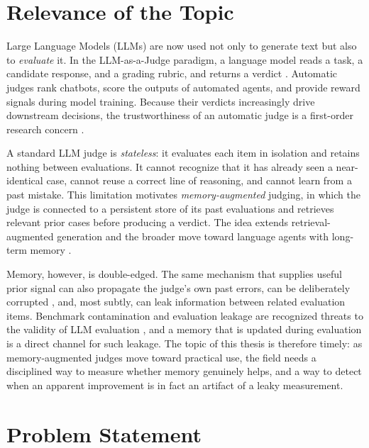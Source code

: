 \documentclass[14pt,a4paper]{extreport}
\begin{document}
\section{Relevance of the Topic}

Large Language Models (LLMs) are now used not only to generate text but also to \emph{evaluate} it. In the LLM-as-a-Judge paradigm, a language model reads a task, a candidate response, and a grading rubric, and returns a verdict \cite{mt_bench2023, geval2023, judge_survey2024}. Automatic judges rank chatbots, score the outputs of automated agents, and provide reward signals during model training. Because their verdicts increasingly drive downstream decisions, the trustworthiness of an automatic judge is a first-order research concern \cite{chateval2023, llm_judge_agreement2024}.

A standard LLM judge is \emph{stateless}: it evaluates each item in isolation and retains nothing between evaluations. It cannot recognize that it has already seen a near-identical case, cannot reuse a correct line of reasoning, and cannot learn from a past mistake. This limitation motivates \emph{memory-augmented} judging, in which the judge is connected to a persistent store of its past evaluations and retrieves relevant prior cases before producing a verdict. The idea extends retrieval-augmented generation \cite{rag_original2020} and the broader move toward language agents with long-term memory \cite{memgpt2023, generative_agents2023, reflexion2023}.

Memory, however, is double-edged. The same mechanism that supplies useful prior signal can also propagate the judge's own past errors, can be deliberately corrupted \cite{rag_poisoning2024}, and, most subtly, can leak information between related evaluation items. Benchmark contamination and evaluation leakage are recognized threats to the validity of LLM evaluation \cite{data_contamination2024, benchmark_contamination2024, eval_leakage2024}, and a memory that is updated during evaluation is a direct channel for such leakage. The topic of this thesis is therefore timely: as memory-augmented judges move toward practical use, the field needs a disciplined way to measure whether memory genuinely helps, and a way to detect when an apparent improvement is in fact an artifact of a leaky measurement.

\section{Problem Statement}
\end{document}
